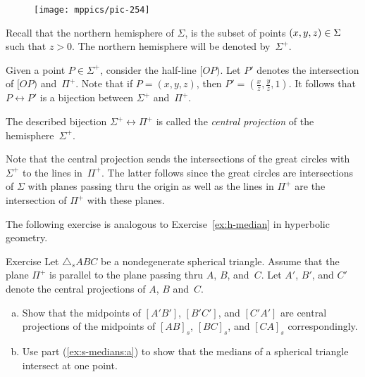 {

\begin{wrapfigure}{r}{40mm}
\centering
\texttt{[image: mppics/pic-254]}
\end{wrapfigure}

Recall that the northern hemisphere of $\Sigma$,
is the subset of points $(x,y,z)\z\in \Sigma$ such that $z>0$.
The northern  hemisphere will be denoted by~$\Sigma^+$.

Given a point $P\in \Sigma^+$, consider the half-line $[OP)$. 
Let $P'$ denotes the intersection of $[OP)$ and~$\Pi^+$.
Note that 
if $P=(x,y,z)$, then $P'=(\tfrac xz,\tfrac yz,1)$.
It follows that $P\leftrightarrow P'$ is a bijection between $\Sigma^+$ and~$\Pi^+$.

}

The described bijection $\Sigma^+\leftrightarrow \Pi^+$ is called the \emph{central projection} of 
the hemisphere~$\Sigma^+$.

Note that the central projection sends the intersections of the great circles with $\Sigma^+$ to the lines in~$\Pi^+$.
The latter follows since the great circles are intersections of $\Sigma$ with planes passing thru the origin
as well as the lines in $\Pi^+$ are the intersection of $\Pi^+$ with these planes.

The following exercise 
is analogous to Exercise~\ref{ex:h-median}
in hyperbolic geometry.

\begin{thm}{Exercise}\label{ex:s-medians}
Let $\triangle_sABC$ be a nondegenerate spherical triangle.
Assume that the plane $\Pi^+$ is parallel to the plane passing thru $A$, $B$, and~$C$.
Let $A'$, $B'$, and $C'$ denote the central projections of $A$, $B$ and~$C$.
\begin{enumerate}[(a)]
\item\label{ex:s-medians:a} Show that the midpoints of $[A'B']$, $[B'C']$, and $[C'A']$
are central projections of the midpoints of $[AB]_s$, $[BC]_s$, and $[CA]_s$ correspondingly.
\item\label{ex:s-medians:b} Use part (\ref{ex:s-medians:a}) to show that the medians of a spherical triangle intersect at one point.
\end{enumerate}

\end{thm}






